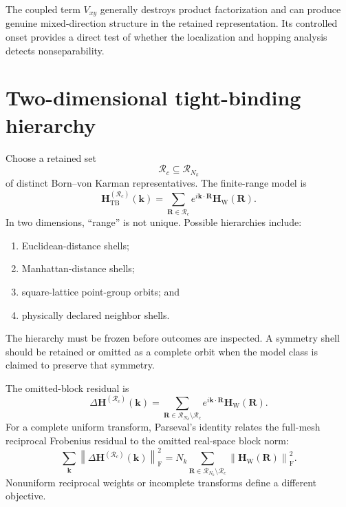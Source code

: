 The coupled term $V_{xy}$ generally destroys product factorization and can
produce genuine mixed-direction structure in the retained representation. Its
controlled onset provides a direct test of whether the localization and
hopping analysis detects nonseparability.

\section{Two-dimensional tight-binding hierarchy}


Choose a retained set
\begin{equation}
    \mathcal R_c\subseteq\mathcal R_{N_k}
\end{equation}
of distinct Born--von Karman representatives. The finite-range model is
\begin{equation}
    \mathbf H_{\mathrm{TB}}^{(\mathcal R_c)}(\mathbf k)
    =
    \sum_{\mathbf R\in\mathcal R_c}
    e^{i\mathbf k\cdot\mathbf R}
    \mathbf H_{\mathrm W}(\mathbf R).
\end{equation}
In two dimensions, ``range'' is not unique. Possible hierarchies include:
\begin{enumerate}
    \item Euclidean-distance shells;
    \item Manhattan-distance shells;
    \item square-lattice point-group orbits; and
    \item physically declared neighbor shells.
\end{enumerate}
The hierarchy must be frozen before outcomes are inspected. A symmetry shell
should be retained or omitted as a complete orbit when the model class is
claimed to preserve that symmetry.

The omitted-block residual is
\begin{equation}
    \Delta\mathbf H^{(\mathcal R_c)}(\mathbf k)
    =
    \sum_{\mathbf R\in\mathcal R_{N_k}\setminus\mathcal R_c}
    e^{i\mathbf k\cdot\mathbf R}
    \mathbf H_{\mathrm W}(\mathbf R).
\end{equation}
For a complete uniform transform, Parseval's identity relates the full-mesh
reciprocal Frobenius residual to the omitted real-space block norm:
\begin{equation}
    \sum_{\mathbf k}
    \left\lVert
        \Delta\mathbf H^{(\mathcal R_c)}(\mathbf k)
    \right\rVert_{\mathrm F}^2
    =
    N_k
    \sum_{\mathbf R\in\mathcal R_{N_k}\setminus\mathcal R_c}
    \left\lVert
        \mathbf H_{\mathrm W}(\mathbf R)
    \right\rVert_{\mathrm F}^2.
\end{equation}
Nonuniform reciprocal weights or incomplete transforms define a different
objective.


